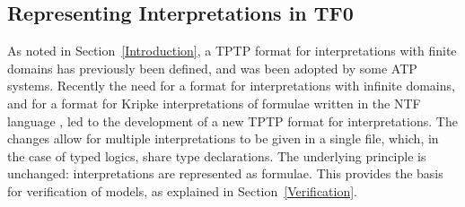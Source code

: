 \documentclass{easychair}
\begin{document}
\subsection{Representing Interpretations in TF0}
\label{InterpretationsTF0}

As noted in Section~\ref{Introduction}, a TPTP format for interpretations with finite domains 
has previously been defined, and was been adopted by some ATP systems.
Recently the need for a format for interpretations with infinite domains, and for a format for 
Kripke interpretations \cite{Kri63} of formulae written in the NTF language \cite{SF+22}, 
led to the development of a new TPTP format for interpretations.
The changes allow for multiple interpretations to be given in a single file, which, in the case 
of typed logics, share type declarations.
The underlying principle is unchanged: interpretations are represented as formulae.
This provides the basis for verification of models, as explained in Section~\ref{Verification}.
\end{document}
